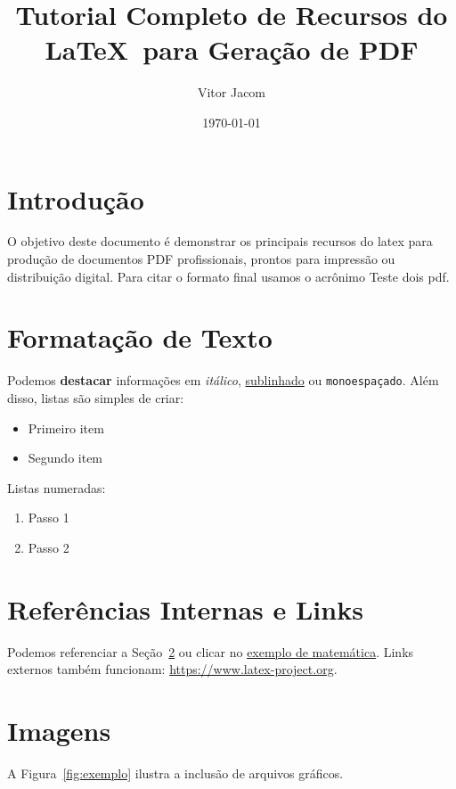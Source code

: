 \documentclass[12pt]{article}
\title{Tutorial Completo de Recursos do \\ \LaTeX\ para Geração de PDF}
\author{Vitor Jacom}
\date{\today}
\begin{document}
\maketitle
\tableofcontents
\newpage

\section{Introdução}
O objetivo deste documento é demonstrar os principais recursos do \gls{latex} para produção de documentos PDF profissionais, prontos para impressão ou distribuição digital. Para citar o formato final usamos o acrônimo Teste dois \gls{pdf}.

\section{Formatação de Texto}\label{sec:texto}
Podemos \textbf{destacar} informações em \textit{itálico}, \underline{sublinhado} ou
\texttt{monoespaçado}. Além disso, listas são simples de criar:

\begin{itemize}[noitemsep]
  \item Primeiro item
  \item Segundo item
\end{itemize}

Listas numeradas:

\begin{enumerate}[label=\arabic*.]
  \item Passo 1
  \item Passo 2
\end{enumerate}

\section{Referências Internas e Links}
Podemos referenciar a Seção~\ref{sec:texto} ou clicar no
\hyperref[sec:matematica]{exemplo de matemática}. Links externos também funcionam: \url{https://www.latex-project.org}.

\section{Imagens}
A Figura~\ref{fig:exemplo} ilustra a inclusão de arquivos gráficos.
\end{document}
